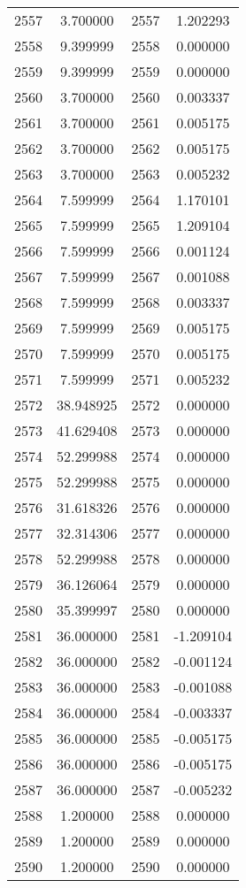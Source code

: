 \documentclass[12pt]{article}
\begin{document}
\begin{longtable}{@{}cccc@{}}
2557 & 3.700000 & 2557 & 1.202293 \\
2558 & 9.399999 & 2558 & 0.000000 \\
2559 & 9.399999 & 2559 & 0.000000 \\
2560 & 3.700000 & 2560 & 0.003337 \\
2561 & 3.700000 & 2561 & 0.005175 \\
2562 & 3.700000 & 2562 & 0.005175 \\
2563 & 3.700000 & 2563 & 0.005232 \\
2564 & 7.599999 & 2564 & 1.170101 \\
2565 & 7.599999 & 2565 & 1.209104 \\
2566 & 7.599999 & 2566 & 0.001124 \\
2567 & 7.599999 & 2567 & 0.001088 \\
2568 & 7.599999 & 2568 & 0.003337 \\
2569 & 7.599999 & 2569 & 0.005175 \\
2570 & 7.599999 & 2570 & 0.005175 \\
2571 & 7.599999 & 2571 & 0.005232 \\
2572 & 38.948925 & 2572 & 0.000000 \\
2573 & 41.629408 & 2573 & 0.000000 \\
2574 & 52.299988 & 2574 & 0.000000 \\
2575 & 52.299988 & 2575 & 0.000000 \\
2576 & 31.618326 & 2576 & 0.000000 \\
2577 & 32.314306 & 2577 & 0.000000 \\
2578 & 52.299988 & 2578 & 0.000000 \\
2579 & 36.126064 & 2579 & 0.000000 \\
2580 & 35.399997 & 2580 & 0.000000 \\
2581 & 36.000000 & 2581 & -1.209104 \\
2582 & 36.000000 & 2582 & -0.001124 \\
2583 & 36.000000 & 2583 & -0.001088 \\
2584 & 36.000000 & 2584 & -0.003337 \\
2585 & 36.000000 & 2585 & -0.005175 \\
2586 & 36.000000 & 2586 & -0.005175 \\
2587 & 36.000000 & 2587 & -0.005232 \\
2588 & 1.200000 & 2588 & 0.000000 \\
2589 & 1.200000 & 2589 & 0.000000 \\
2590 & 1.200000 & 2590 & 0.000000 \\

\end{longtable}
\end{document}
